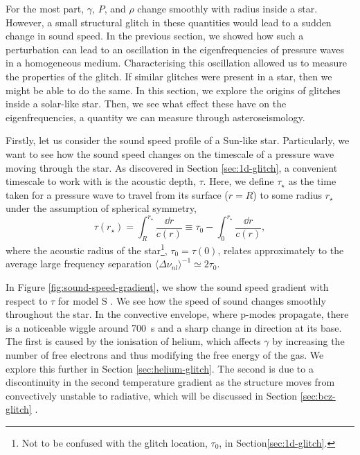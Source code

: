 For the most part, \(\gamma\), \(P\), and \(\rho\) change smoothly with radius inside a star. However, a small structural glitch in these quantities would lead to a sudden change in sound speed. In the previous section, we showed how such a perturbation can lead to an oscillation in the eigenfrequencies of pressure waves in a homogeneous medium. Characterising this oscillation allowed us to measure the properties of the glitch. If similar glitches were present in a star, then we might be able to do the same. In this section, we explore the origins of glitches inside a solar-like star. Then, we see what effect these have on the eigenfrequencies, a quantity we can measure through asteroseismology.

Firstly, let us consider the sound speed profile of a Sun-like star. Particularly, we want to see how the sound speed changes on the timescale of a pressure wave moving through the star. As discovered in Section \ref{sec:1d-glitch}, a convenient timescale to work with is the acoustic depth, \(\tau\). Here, we define \(\tau_\star\) as the time taken for a pressure wave to travel from its surface (\(r=R\)) to some radius \(r_\star\) under the assumption of spherical symmetry,
%
\begin{equation}
    \tau(r_\star) = \int_R^{r_\star} \frac{\dd r}{c(r)} \equiv \tau_0 - \int_0^{r_\star} \frac{\dd r}{c(r)},
\end{equation}
%
where the acoustic radius of the star\footnote{Not to be confused with the glitch location, \(\tau_0\), in Section\ref{sec:1d-glitch}.}, \(\tau_0 = \tau(0)\), relates approximately to the average large frequency separation \(\langle\Delta\nu_{nl}\rangle^{-1} \simeq 2\tau_0\).

In Figure \ref{fig:sound-speed-gradient}, we show the sound speed gradient with respect to \(\tau\) for model S . We see how the speed of sound changes smoothly throughout the star. In the convective envelope, where p-modes propagate, there is a noticeable wiggle around \SI{700}{\second} and a sharp change in direction at its base. The first is caused by the ionisation of helium, which affects \(\gamma\) by increasing the number of free electrons and thus modifying the free energy of the gas. We explore this further in Section \ref{sec:helium-glitch}. The second is due to a discontinuity in the second temperature gradient as the structure moves from convectively unstable to radiative, which will be discussed in Section \ref{sec:bcz-glitch} .

